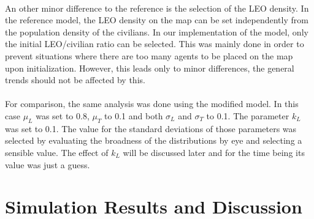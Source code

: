 \documentclass[11pt]{article}
\begin{document}
\\
An other minor difference to the reference is the selection of the LEO density. In the reference model, the LEO density on the map can be set independently from the population density of the civilians. In our implementation of the model, only the initial LEO/civilian ratio can be selected. This was mainly done in order to prevent situations where there are too many agents to be placed on the map upon initialization. However, this leads only to minor differences, the general trends should not be affected by this.\\
\\
For comparison, the same analysis was done using the modified model. In this case $\mu_L$ was set to 0.8, $\mu_T$ to 0.1 and both $\sigma_L$ and $\sigma_T$ to 0.1. The parameter $k_L$ was set to 0.1. The value for the standard deviations of those parameters was selected by evaluating the broadness of the distributions by eye and selecting a sensible value. The effect of $k_L$ will be discussed later and for the time being its value was just a guess.

\section{Simulation Results and Discussion}
\end{document}
